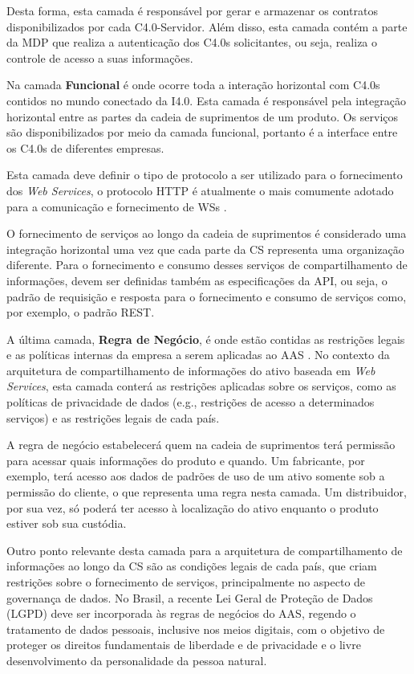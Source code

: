 	Desta forma, esta camada é responsável por gerar e armazenar os contratos disponibilizados por cada C4.0-Servidor. Além disso, esta camada contém a parte da MDP que realiza a autenticação dos C4.0s solicitantes, ou seja, realiza o controle de acesso a suas informações.
	
	Na camada \textbf{Funcional} é onde ocorre toda a interação horizontal com C4.0s contidos no mundo conectado da I4.0. Esta camada é responsável pela integração horizontal entre as partes da cadeia de suprimentos de um produto. Os serviços são disponibilizados por meio da camada funcional, portanto é a interface entre os C4.0s de diferentes empresas.
	
	Esta camada deve definir o tipo de protocolo a ser utilizado para o fornecimento dos \textit{Web Services}, o protocolo HTTP é atualmente o mais comumente adotado para a comunicação e fornecimento de WSs \cite{gruner2016restful}. %
	
	O fornecimento de serviços ao longo da cadeia de suprimentos é considerado uma integração horizontal uma vez que cada parte da CS representa uma organização diferente. Para o fornecimento e consumo desses serviços de compartilhamento de informações, devem ser definidas também as especificações da API, ou seja, o padrão de requisição e resposta para o fornecimento e consumo de serviços como, por exemplo, o padrão REST.
			
	A última camada, \textbf{Regra de Negócio}, é onde estão contidas as restrições legais e as políticas internas da empresa a serem aplicadas ao AAS \cite{adolphs2015rami}. No contexto da arquitetura de compartilhamento de informações do ativo baseada em \textit{Web Services}, esta camada conterá as restrições aplicadas sobre os serviços, como as políticas de privacidade de dados (e.g., restrições de acesso a determinados serviços) e as restrições legais de cada país.
	
	A regra de negócio estabelecerá quem na cadeia de suprimentos terá permissão para acessar quais informações do produto e quando. Um fabricante, por exemplo, terá acesso aos dados de padrões de uso de um ativo somente sob a permissão do cliente, o que representa uma regra nesta camada. Um distribuidor, por sua vez, só poderá ter acesso à localização do ativo enquanto o produto estiver sob sua custódia.
	
	Outro ponto relevante desta camada para a arquitetura de compartilhamento de informações ao longo da CS são as condições legais de cada país, que criam restrições sobre o fornecimento de serviços, principalmente no aspecto de governança de dados. No Brasil, a recente Lei Geral de Proteção de Dados (LGPD) \cite{brasil2018lgpd} deve ser incorporada às regras de negócios do AAS, regendo o tratamento de dados pessoais, inclusive nos meios digitais, com o objetivo de proteger os direitos fundamentais de liberdade e de privacidade e o livre desenvolvimento da personalidade da pessoa natural.
	

